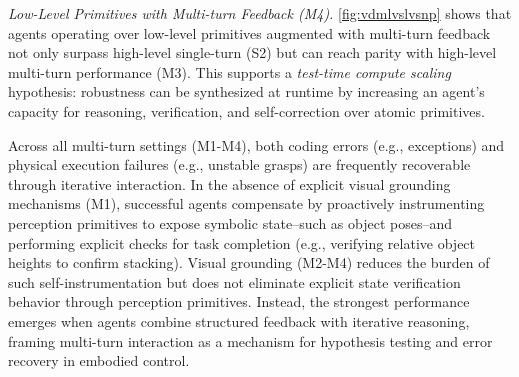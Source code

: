 \textit{Low-Level Primitives with Multi-turn Feedback (M4).} \cref{fig:vdmlvslvsnp} shows that agents operating over low-level primitives augmented with multi-turn feedback not only surpass high-level single-turn (S2) but can reach parity with high-level multi-turn performance (M3). This supports a \emph{test-time compute scaling} hypothesis: robustness can be synthesized at runtime by increasing an agent’s capacity for reasoning, verification, and self-correction over atomic primitives.

Across all multi-turn settings (M1-M4), both coding errors (e.g., exceptions) and physical execution failures (e.g., unstable grasps) are frequently recoverable through iterative interaction. In the absence of explicit visual grounding mechanisms (M1), successful agents compensate by proactively instrumenting perception primitives to expose symbolic state--such as object poses--and performing explicit checks for task completion (e.g., verifying relative object heights to confirm stacking). Visual grounding (M2-M4) reduces the burden of such self-instrumentation but does not eliminate explicit state verification behavior through perception primitives. Instead, the strongest performance emerges when agents combine structured feedback with iterative reasoning, framing multi-turn interaction as a mechanism for hypothesis testing and error recovery in embodied control.


































    
